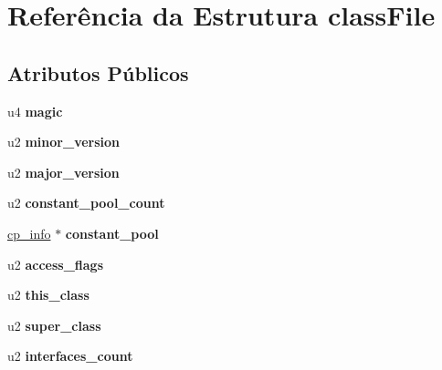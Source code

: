 \hypertarget{structclassFile}{}\section{Referência da Estrutura class\+File}
\label{structclassFile}
\subsection*{Atributos Públicos}
\begin{DoxyCompactItemize}
\item 
\mbox{\label{structclassFile_a3fec808625410854af3cb80b7faeca10}} 
u4 {\bfseries magic}
\item 
\mbox{\label{structclassFile_aa7b4e7ee91468a9a2989dd9ec93c3ea0}} 
u2 {\bfseries minor\+\_\+version}
\item 
\mbox{\label{structclassFile_a3765d2f6ef5f54e8e2c554afadb795f6}} 
u2 {\bfseries major\+\_\+version}
\item 
\mbox{\label{structclassFile_ac8f5b297483f2b3e9f02ff133f248b40}} 
u2 {\bfseries constant\+\_\+pool\+\_\+count}
\item 
\mbox{\label{structclassFile_adb70ba83c3ffbcc26bffaff8185be813}} 
\hyperlink{structcp__info}{cp\+\_\+info} $\ast$ {\bfseries constant\+\_\+pool}
\item 
\mbox{\label{structclassFile_a78e101546396d4b3d24d89b084b4eadf}} 
u2 {\bfseries access\+\_\+flags}
\item 
\mbox{\label{structclassFile_a152ce2f57b3fa175b95069452f9fa063}} 
u2 {\bfseries this\+\_\+class}
\item 
\mbox{\label{structclassFile_a7d16e11061e4520ac93df39a5a65a215}} 
u2 {\bfseries super\+\_\+class}
\item 
\mbox{\label{structclassFile_ab1ef5a76288d97e248fd48a46e93a185}} 
u2 {\bfseries interfaces\+\_\+count}
\item 
\mbox{\label{structclassFile_a4b17bc5bb5475d1f7db40302ba9e1df1}} 

\end{DoxyCompactItemize}
